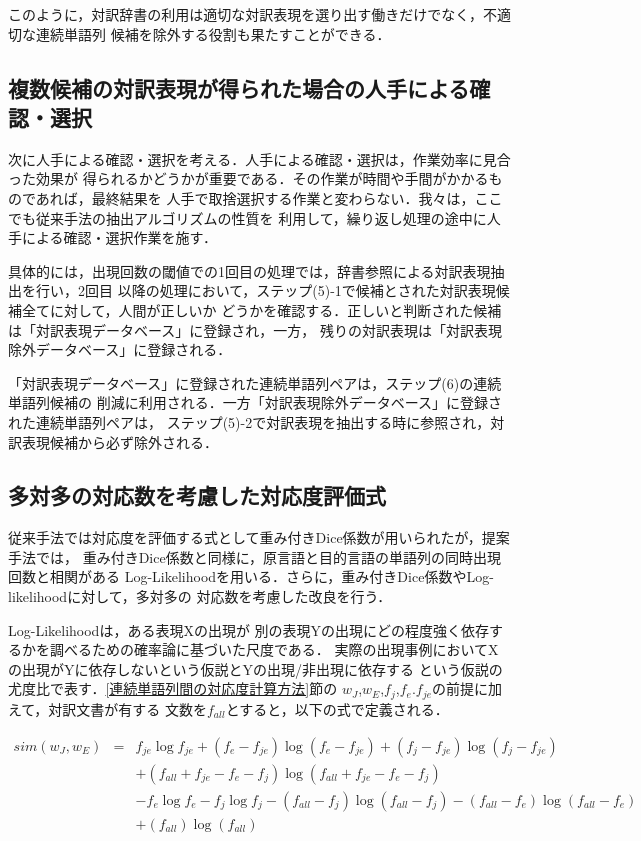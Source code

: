 このように，対訳辞書の利用は適切な対訳表現を選り出す働きだけでなく，不適切な連続単語列
候補を除外する役割も果たすことができる．

\subsection{複数候補の対訳表現が得られた場合の人手による確認・選択}

次に人手による確認・選択を考える．人手による確認・選択は，作業効率に見合った効果が
得られるかどうかが重要である．その作業が時間や手間がかかるものであれば，最終結果を
人手で取捨選択する作業と変わらない．我々は，ここでも従来手法の抽出アルゴリズムの性質を
利用して，繰り返し処理の途中に人手による確認・選択作業を施す．

具体的には，出現回数の閾値での1回目の処理では，辞書参照による対訳表現抽出を行い，2回目
以降の処理において，ステップ(5)-1で候補とされた対訳表現候補全てに対して，人間が正しいか
どうかを確認する．正しいと判断された候補は「対訳表現データベース」に登録され，一方，
残りの対訳表現は「対訳表現除外データベース」に登録される．

「対訳表現データベース」に登録された連続単語列ペアは，ステップ(6)の連続単語列候補の
削減に利用される．一方「対訳表現除外データベース」に登録された連続単語列ペアは，
ステップ(5)-2で対訳表現を抽出する時に参照され，対訳表現候補から必ず除外される．
　
\subsection{多対多の対応数を考慮した対応度評価式}
\label{多対多評価式}

従来手法では対応度を評価する式として重み付きDice係数が用いられたが，提案手法では，
重み付きDice係数と同様に，原言語と目的言語の単語列の同時出現回数と相関がある
Log-Likelihoodを用いる．さらに，重み付きDice係数やLog-likelihoodに対して，多対多の
対応数を考慮した改良を行う．

Log-Likelihood\cite{Dunning:1993,Matsumoto-Utsuro:2000}は，ある表現Xの出現が
別の表現Yの出現にどの程度強く依存するかを調べるための確率論に基づいた尺度である．
実際の出現事例においてXの出現がYに依存しないという仮説とYの出現/非出現に依存する
という仮説の尤度比で表す．\ref{連続単語列間の対応度計算方法}節の
$w_{J}$,$w_{E}$,$f_{j}$,$f_{e}$.$f_{je}$の前提に加えて，対訳文書が有する
文数を$f_{all}$とすると，以下の式で定義される．

\begin{small}
\begin{eqnarray*}
sim(w_{J},w_{E})&=& f_{je} \log f_{je} + (f_{e}-f_{je}) \log(f_{e}-f_{je}) + (f_{j}-f_{je})\log(f_{j}-f_{je})\\
                 &&+(f_{all}+f_{je}-f_{e}-f_{j})\log(f_{all}+f_{je}-f_{e}-f_{j}) \\
                 &&- f_{e}\log f_{e}-f_{j}\log f_{j}- (f_{all}-f_{j})\log(f_{all}-f_{j})-(f_{all}-f_{e})\log(f_{all}-f_{e})\\
                 &&+(f_{all})\log(f_{all})
\end{eqnarray*}
\end{small}


